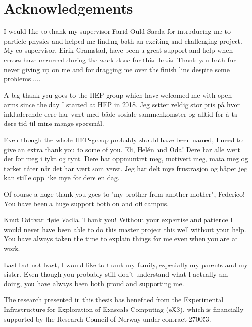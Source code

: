 \chapter*{Acknowledgements}
I would like to thank my supervisor Farid Ould-Saada for introducing me to particle physics and helped me finding both an exciting and challenging project. My co-supervisor, Eirik Gramstad, have been a great support and help when errors have occurred during the work done for this thesis. Thank you both for never giving up on me and for dragging me over the finish line despite some problems ....

A big thank you goes to the HEP-group which have welcomed me with open arms since the day I started at HEP in 2018. Jeg setter veldig stor pris på hvor inkluderende dere har vært med både sosiale sammenkomster og alltid for å ta dere tid til mine mange spørsmål. 

Even though the whole HEP-group probably should have been named, I need to give an extra thank you to some of you. Eli, Helén and Oda! Dere har alle vært der for meg i tykt og tynt. Dere har oppmuntret meg, motivert meg, mata meg og tørket tårer når det har vært som verst. Jeg har delt mye frustrasjon og håper jeg kan stille opp like mye for dere en dag.

Of course a huge thank you goes to "my brother from another mother", Federico! You have been a huge support both on and off campus. 

Knut Oddvar Høie Vadla. Thank you! Without your expertise and patience I would never have been able to do this master project this well without your help. You have always taken the time to explain things for me even when you are at work.

Last but not least, I would like to thank my family, especially my parents and my sister. Even though you probably still don't understand what I actually am doing, you have always been both proud and supporting me. 

The research presented in this thesis has benefited from the Experimental Infrastructure for Exploration of Exascale Computing (eX3), which is financially supported by the Research Council of Norway under contract 270053.



